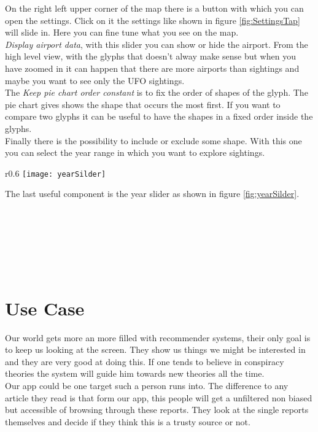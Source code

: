 \documentclass{article}
\begin{document}
On the right left upper corner of the map there is a button with which you can open the settings.
Click on it the settings like shown in figure \ref{fig:SettingsTap} will slide in. Here you can fine tune
what you see on the map. \\
\textit{Display airport data}, with this slider you can show or hide the airport. From the high level view,
with the glyphs that doesn't alway make sense but when you have zoomed in it can happen that there
are more airports than sightings and maybe you want to see only the UFO sightings.
\\
The \textit{Keep pie chart order constant} is to fix the order of shapes of the glyph. The pie chart gives
shows the shape that occurs the most first. If you want to compare two glyphs it can be useful to have the
shapes in a fixed order inside the glyphs.
\\
Finally there is the possibility to include or exclude some shape. With this one you can
select the year range in which you want to explore sightings. 
\\


\begin{wrapfigure}{r}{0.6\textwidth} 
    \centering
    \texttt{[image: yearSilder]}
    \caption{Legend of the East Coast USA glyph}
    \label{fig:yearSilder}
\end{wrapfigure}

The last useful component is the year slider as shown in figure \ref{fig:yearSilder}. 
\\\\\\\\\\\\\\

\section*{Use Case}

Our world gets more an more filled with recommender systems, their only goal is to keep us looking at the screen. They show us things we might be interested in and they are very good at doing this. If one tends to believe in conspiracy theories the system will guide him towards new theories all the time.  \\
Our app could be one target such a person runs into. The difference to any article they read is that form our app, this people will get a unfiltered non biased but accessible of browsing through these reports. They look at the single reports themselves and decide if they think this is a trusty source or not. \\
\end{document}
